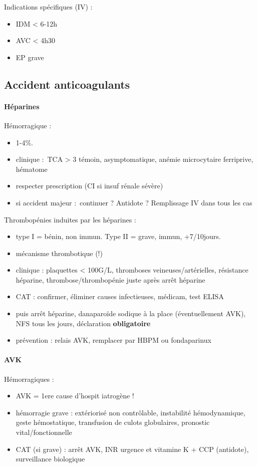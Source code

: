 Indications spécifiques (IV) : 
\begin{itemize}
  \item IDM < 6-12h
  \item AVC < 4h30
  \item EP grave
\end{itemize}

\subsection{Accident anticoagulants}
\paragraph{Héparines}
Hémorragique : 
\begin{itemize}
  \item 1-4\%.
  \item clinique : TCA > 3 témoin, asymptomatique, anémie microcytaire
    ferriprive, hématome
  \item respecter prescription (CI si insuf rénale sévère)
  \item si accident majeur : continuer ? Antidote ? Remplissage IV dans tous les
    cas
\end{itemize}
Thrombopénies induites par les héparines : 
\begin{itemize}
  \item type I = bénin, non immun. Type II = grave, immun, +7/10jours.
  \item mécanisme thrombotique (!)
  \item clinique : plaquettes < 100G/L, thromboses veineuses/artérielles,
    résistance héparine, thrombose/thrombopénie juste après arrêt héparine
  \item CAT : confirmer, éliminer causes infectieuses, médicam, test ELISA
  \item puis arrêt héparine, danaparoïde sodique à la place (éventuellement
    AVK), NFS tous les jours, déclaration \textbf{obligatoire} 
  \item prévention : relais AVK, remplacer par HBPM ou fondaparinux
\end{itemize}

\paragraph{AVK}
Hémorragiques : 
\begin{itemize}
  \item AVK = 1ere cause d'hospit iatrogène !
  \item hémorragie grave : extériorisé non contrôlable, instabilité
    hémodynamique, geste hémostatique, transfusion de culots globulaires,
    pronostic vital/fonctionnelle
  \item CAT (si grave) : arrêt AVK, INR urgence et vitamine K + CCP (antidote),
    surveillance biologique
\end{itemize}

